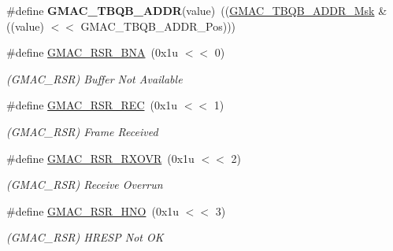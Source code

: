 \begin{DoxyCompactItemize}
\mbox{\label{group__SAME70__GMAC_ga1cfa7b225e0fa8660b20fe443be3c4cb}} 
\#define {\bfseries G\+M\+A\+C\+\_\+\+T\+B\+Q\+B\+\_\+\+A\+D\+DR}(value)~((\mbox{\hyperlink{group__SAMV71__GMAC_gaf89359a485905c67a16b25227df29edc}{G\+M\+A\+C\+\_\+\+T\+B\+Q\+B\+\_\+\+A\+D\+D\+R\+\_\+\+Msk}} \& ((value) $<$$<$ G\+M\+A\+C\+\_\+\+T\+B\+Q\+B\+\_\+\+A\+D\+D\+R\+\_\+\+Pos)))
\item 
\mbox{\label{group__SAME70__GMAC_gadb961ee999ad7f99aa8cf186fb1c062e}} 
\#define \mbox{\hyperlink{group__SAME70__GMAC_gadb961ee999ad7f99aa8cf186fb1c062e}{G\+M\+A\+C\+\_\+\+R\+S\+R\+\_\+\+B\+NA}}~(0x1u $<$$<$ 0)
\begin{DoxyCompactList}\small\item\em (G\+M\+A\+C\+\_\+\+R\+SR) Buffer Not Available \end{DoxyCompactList}\item 
\mbox{\label{group__SAME70__GMAC_gae73911674a5d00cf3a6cff9c9a03eced}} 
\#define \mbox{\hyperlink{group__SAME70__GMAC_gae73911674a5d00cf3a6cff9c9a03eced}{G\+M\+A\+C\+\_\+\+R\+S\+R\+\_\+\+R\+EC}}~(0x1u $<$$<$ 1)
\begin{DoxyCompactList}\small\item\em (G\+M\+A\+C\+\_\+\+R\+SR) Frame Received \end{DoxyCompactList}\item 
\mbox{\label{group__SAME70__GMAC_ga907d41c013b82e8b18111980067b78f0}} 
\#define \mbox{\hyperlink{group__SAME70__GMAC_ga907d41c013b82e8b18111980067b78f0}{G\+M\+A\+C\+\_\+\+R\+S\+R\+\_\+\+R\+X\+O\+VR}}~(0x1u $<$$<$ 2)
\begin{DoxyCompactList}\small\item\em (G\+M\+A\+C\+\_\+\+R\+SR) Receive Overrun \end{DoxyCompactList}\item 
\mbox{\label{group__SAME70__GMAC_ga8d2f0d4cf3d127479b34eec4b545f835}} 
\#define \mbox{\hyperlink{group__SAME70__GMAC_ga8d2f0d4cf3d127479b34eec4b545f835}{G\+M\+A\+C\+\_\+\+R\+S\+R\+\_\+\+H\+NO}}~(0x1u $<$$<$ 3)
\begin{DoxyCompactList}\small\item\em (G\+M\+A\+C\+\_\+\+R\+SR) H\+R\+E\+SP Not OK \end{DoxyCompactList}\item 
$$
\end{DoxyCompactItemize}
